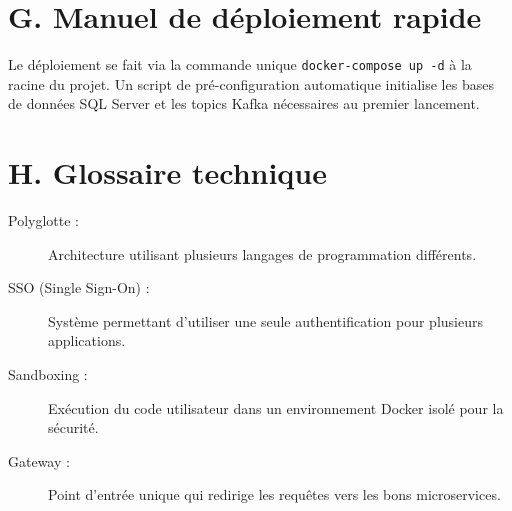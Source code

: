 \documentclass[12pt,a4paper]{report}
\begin{document}
    \section*{G. Manuel de déploiement rapide}
    Le déploiement se fait via la commande unique \texttt{docker-compose up -d} à la racine du projet. Un script de pré-configuration automatique initialise les bases de données SQL Server et les topics Kafka nécessaires au premier lancement.

    \section*{H. Glossaire technique}
    \begin{description}
        \item[Polyglotte :] Architecture utilisant plusieurs langages de programmation différents.
        \item[SSO (Single Sign-On) :] Système permettant d'utiliser une seule authentification pour plusieurs applications.
        \item[Sandboxing :] Exécution du code utilisateur dans un environnement Docker isolé pour la sécurité.
        \item[Gateway :] Point d'entrée unique qui redirige les requêtes vers les bons microservices.
    \end{description}
	
\end{document}
